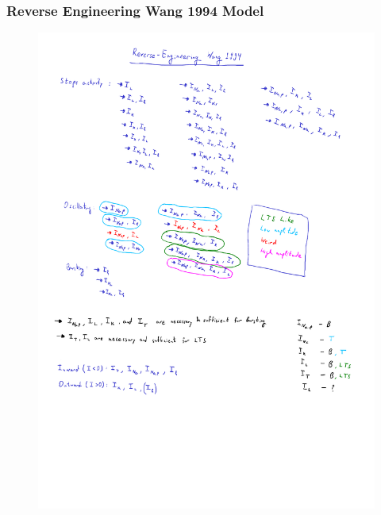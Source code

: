 \documentclass[../../workflow.tex]{subfiles}
\begin{document}
\subsubsection{Reverse Engineering Wang 1994 Model}
\begin{figure}[H]
    \centering
    \includegraphics[height=0.9\textheight, page=1]{Handwritten Notes/R5 Model/Wang1994_reverse_engineering.pdf}
\end{figure}
\end{document}
